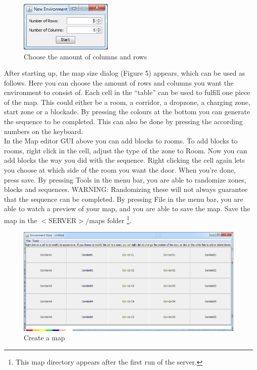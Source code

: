 \begin{figure}
  \begin{center}
    \includegraphics[width=0.4\textwidth]{mapsize.png}
  \end{center}
  \caption{Choose the amount of columns and rows}
\end{figure}
After starting up, the map size dialog (Figure 5) appears, which can be used as follows.
Here you can choose the amount of rows and columns you want the environment to consist of. Each cell in the “table” can be used to fulfill one piece of the map. This could either be a room, a corridor, a dropzone, a charging zone, start zone or a blockade. By pressing the colours at the bottom you can generate the sequence to be completed. This can also be done by pressing the according numbers on the keyboard. \\
In the Map editor GUI above you can add blocks to rooms. To add blocks to rooms, right click in the cell, adjust the type of the zone to Room. Now you can add blocks the way you did with the sequence. Right clicking the cell again lets you choose at which side of the room you want the door. When you're done, press save. 
By pressing Tools in the menu bar, you are able to randomize zones, blocks and sequences. WARNING: Randomizing these will not always guarantee that the sequence can be completed.
By pressing File in the menu bar, you are able to watch a preview of your map, and you are able to save the map. Save the map in the $<$SERVER$>/$maps folder \footnote[1]{This map directory appears after the first run of the server.}.  
\begin{figure}
    \includegraphics[width=\textwidth]{grid.png}
    \caption{Create a map}
\end{figure}


